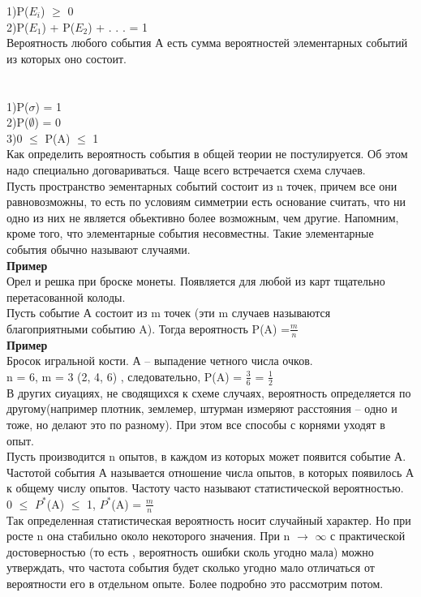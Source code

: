 \documentclass[russian, 12pt]{article}
\begin{document}
1)P($E_{i}$) $\geq$ 0  \\
2)P($E_{1}$) + P($E_{2}$) + . . . = 1\\
Вероятность любого события А есть сумма вероятностей элементарных событий из которых оно состоит.\\\\\\
1)P($\sigma$) = 1\\
2)P($\emptyset$) = 0\\
3)0 $\leq$ P(A) $\leq$ 1\\
Как определить вероятность события в общей теории не постулируется. Об этом надо специально договариваться. Чаще всего встречается схема случаев.\\
Пусть  пространство эементарных событий состоит из n точек, причем все они равновозможны, то есть  по условиям симметрии есть основание считать, что ни одно из них не является обьективно более возможным, чем другие. Напомним, кроме того, что элементарные  события  
несовместны. Такие элементарные события обычно называют случаями.\\
\textbf{Пример}\\Орел и решка при броске монеты. Появляется для любой  из карт тщательно перетасованной колоды.\\
Пусть событие А состоит из m точек (эти m случаев называются благоприятными событию A). Тогда вероятность P(A)  =$\frac{m}{n}$\\
\textbf{Пример}\\Бросок игральной кости. А  -- выпадение четного числа очков.\\n = 6, m = 3 (2, 4, 6) , следовательно, P(A) = $\frac{3}{6}$ = $\frac{1}{2}$ \\
В других сиуациях, не сводящихся к схеме случаях, вероятность определяется по другому(например плотник, землемер, штурман измеряют расстояния -- одно и тоже, но делают это по разному). При этом все способы 
с корнями уходят в опыт.\\
Пусть производится n опытов, в каждом из которых может появится событие А. Частотой события А называется отношение числа опытов, в которых появилось А к общему числу опытов. Частоту часто называют статистической вероятностью.\\ 
 0 $\leq$ $P^*$(A) $\leq$ 1, $P^*$(A) = $\frac{m}{n}$\\
Так определенная статистическая вероятность носит случайный характер. Но при росте n она стабильно около некоторого значения. При n  $\rightarrow$  $\infty$ с практической достоверностью (то есть , вероятность ошибки сколь угодно мала) можно утверждать, что частота события будет сколько угодно мало отличаться от вероятности его в отдельном опыте. Более подробно это рассмотрим потом.\\
\end{document}
